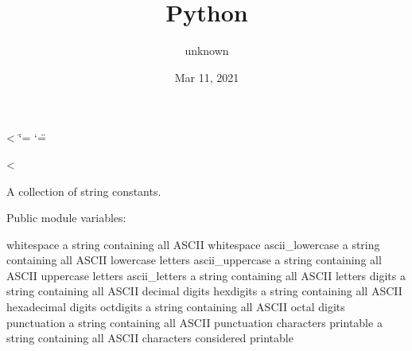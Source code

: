 \documentclass[letterpaper,10pt,english]{sphinxmanual}
\title{Python}
\date{Mar 11, 2021}
\author{unknown}
\begin{document}
<%
  \ifnum\catcode`\=\string=\active\shorthandoff{=}\fi
  \ifnum\catcode`\"=\active{}\fi
\fi

<%
\sphinxmaketitle
\pagestyle{plain}
\sphinxtableofcontents
\pagestyle{normal}
\label{\detokenize{index::doc}}

A collection of string constants.

Public module variables:

whitespace \textendash{} a string containing all ASCII whitespace
ascii\_lowercase \textendash{} a string containing all ASCII lowercase letters
ascii\_uppercase \textendash{} a string containing all ASCII uppercase letters
ascii\_letters \textendash{} a string containing all ASCII letters
digits \textendash{} a string containing all ASCII decimal digits
hexdigits \textendash{} a string containing all ASCII hexadecimal digits
octdigits \textendash{} a string containing all ASCII octal digits
punctuation \textendash{} a string containing all ASCII punctuation characters
printable \textendash{} a string containing all ASCII characters considered printable


\vspace{10px}




\vspace{-5px}
\end{document}
